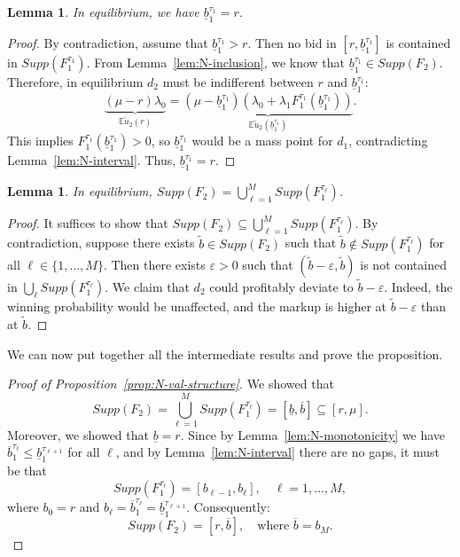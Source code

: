 \documentclass[11pt]{article}
\theoremstyle{plain}
\theoremstyle{definition}
\theoremstyle{plain}
\theoremstyle{plain}
\theoremstyle{plain}
\newtheorem{lem}[thm]{Lemma}
\theoremstyle{plain}
\numberwithin{equation}{section}
\begin{document}
\begin{lem}\label{lem:N-lowest}
In equilibrium, we have $\underline{b}_1^{\tau_1} = r$.
\end{lem}

\begin{proof}
By contradiction, assume that $\underline{b}_1^{\tau_1} > r$. Then no bid in $[r, \underline{b}_1^{\tau_1}]$ is contained in $Supp(F_1^{\tau_1})$. From Lemma~\ref{lem:N-inclusion}, we know that $\underline{b}_1^{\tau_1} \in Supp(F_2)$. Therefore, in equilibrium $d_2$ must be indifferent between $r$ and $\underline{b}_1^{\tau_1}$:
\[
\underbrace{(\mu - r) \lambda_0}_{\mathbb{E}\tilde{u}_2(r)} = \underbrace{(\mu - \underline{b}_1^{\tau_1}) \left( \lambda_0 + \lambda_1 F_1^{\tau_1}(\underline{b}_1^{\tau_1}) \right)}_{\mathbb{E}\tilde{u}_2(\underline{b}_1^{\tau_1})}.
\]
This implies $F_1^{\tau_1}(\underline{b}_1^{\tau_1}) > 0$, so $\underline{b}_1^{\tau_1}$ would be a mass point for $d_1$, contradicting Lemma~\ref{lem:N-interval}. Thus, $\underline{b}_1^{\tau_1} = r$.
\end{proof}

\vspace{0.4cm}

\begin{lem}\label{lem:N-union}
In equilibrium, $Supp(F_2) = \bigcup_{\ell=1}^{M} Supp(F_1^{\tau_\ell})$.
\end{lem}

\begin{proof}
It suffices to show that $Supp(F_2) \subseteq \bigcup_{\ell=1}^{M} Supp(F_1^{\tau_\ell})$. By contradiction, suppose there exists $\tilde{b} \in Supp(F_2)$ such that $\tilde{b} \notin Supp(F_1^{\tau_\ell})$ for all $\ell \in \{1, \ldots, M\}$. Then there exists $\varepsilon > 0$ such that $(\tilde{b} - \varepsilon, \tilde{b})$ is not contained in $\bigcup_{\ell} Supp(F_1^{\tau_\ell})$. We claim that $d_2$ could profitably deviate to $\tilde{b} - \varepsilon$. Indeed, the winning probability would be unaffected, and the markup is higher at $\tilde{b} - \varepsilon$ than at $\tilde{b}$.
\end{proof}

\vspace{0.2cm}

\noindent We can now put together all the intermediate results and prove the proposition.

\vspace{0.2cm}

\begin{proof}[Proof of Proposition~\ref{prop:N-val-structure}]
We showed that
\[
Supp(F_2) = \bigcup_{\ell=1}^{M} Supp(F_1^{\tau_\ell}) = [\underline{b}, \overline{b}] \subseteq [r, \mu].
\]
Moreover, we showed that $\underline{b} = r$. Since by Lemma~\ref{lem:N-monotonicity} we have $\overline{b}_1^{\tau_\ell} \leq \underline{b}_1^{\tau_{\ell+1}}$ for all $\ell$, and by Lemma~\ref{lem:N-interval} there are no gaps, it must be that
\[
Supp(F_1^{\tau_\ell}) = [b_{\ell-1}, b_\ell], \quad \ell = 1, \ldots, M,
\]
where $b_0 = r$ and $b_\ell = \overline{b}_1^{\tau_\ell} = \underline{b}_1^{\tau_{\ell+1}}$. Consequently:
\[
Supp(F_2) = [r, \overline{b}], \quad \text{where } \overline{b} = b_M.
\]
\end{proof}
\end{document}
